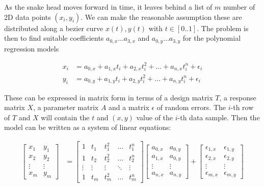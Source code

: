 As the snake head moves forward in time, it leaves behind a list of $m$ number of 2D data points $(x_i,y_i)$. We can make the reasonable assumption these are distributed along a bezier curve $x(t),y(t)$ with $t\in[0..1]$. The problem is then to find suitable coefficients $a_{0,x} \ldots a_{3,x}$ and $a_{0,y} \ldots a_{3,y}$ for the polynomial regression models

\begin{align}
    x_i &= a_{0,x} + a_{1,x} t_i + a_{2,x} t_i^2 + \ldots + a_{n,x} t_i^n + \epsilon_i \\
    y_i &= a_{0,y} + a_{1,y} t_i + a_{2,y} t_i^2 + \ldots + a_{n,y} t_i^n + \epsilon_i
    \label{eq:regression-models}
\end{align}

These can be expressed in matrix form in terms of a design matrix $T$, a response matrix $X$, a parameter matrix $A$ and a matrix $\epsilon$ of random errors. The $i$-th row of $T$ and $X$ will contain the $t$ and $(x,y)$ value of the $i$-th data sample. Then the model can be written as a system of linear equations:

\begin{align}
    \begin{bmatrix}
        x_1 & y_1 \\ x_2 & y_2 \\ \vdots & \vdots \\ x_m & y_m
    \end{bmatrix}
    &=
    \begin{bmatrix}
        1      & t_1     & t_1^2     & \ldots & t_1^n \\
        1      & t_2     & t_2^2     & \ldots & t_2^n \\
        \vdots & \vdots  & \vdots    & \ddots & \vdots \\
        1      & t_m     & t_m^2     & \ldots & t_m^n
    \end{bmatrix}
    \begin{bmatrix}
        a_{0,x} & a_{0,y} \\
        a_{1,x} & a_{0,y} \\
        \vdots  & \vdots \\
        a_{n,x} & a_{n,y}
    \end{bmatrix}
    +
    \begin{bmatrix}
        \epsilon_{1,x} & \epsilon_{1,y} \\
        \epsilon_{2,x} & \epsilon_{2,y} \\
        \vdots         & \vdots \\
        \epsilon_{m,x} & \epsilon_{m,y}
    \end{bmatrix}
    \label{eq:regression-model}
\end{align}

